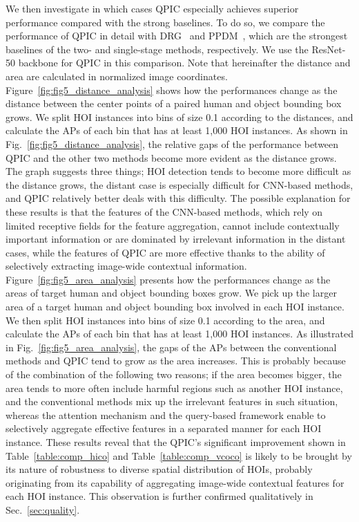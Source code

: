 \documentclass[final]{cvpr}
\begin{document}
We then investigate in which cases QPIC especially achieves superior performance compared with the strong baselines.
To do so, we compare the performance of QPIC in detail with DRG~\cite{gao_eccv2020} and PPDM~\cite{liao_cvpr2020}, which are the strongest baselines of the two- and single-stage methods, respectively. 
We use the ResNet-50 backbone for QPIC in this comparison.
Note that hereinafter the distance and area are calculated in normalized image coordinates.
Figure~\ref{fig:fig5_distance_analysis} shows how the performances change as the distance between the center points of a paired human and object bounding box grows.
We split HOI instances into bins of size 0.1 according to the distances, and calculate the APs of each bin that has at least 1,000 HOI instances.
As shown in Fig.~\ref{fig:fig5_distance_analysis}, the relative gaps of the performance between QPIC and the other two methods become more evident as the distance grows.
The graph suggests three things; 
 HOI detection tends to become more difficult as the distance grows,
 the distant case is especially difficult for CNN-based methods,
 and QPIC relatively better deals with this difficulty.
The possible explanation for these results is that the features of the CNN-based methods, which rely on limited receptive fields for the feature aggregation, 
cannot include contextually important information or are dominated by irrelevant information in the distant cases, while the features of QPIC are more effective thanks to the ability of selectively extracting image-wide contextual information.
Figure~\ref{fig:fig5_area_analysis} presents how the performances change as the areas of target human and object bounding boxes grow. 
We pick up the larger area of a target human and object bounding box involved in each HOI instance.
We then split HOI instances into bins of size 0.1 according to the area, and calculate the APs of each bin that has at least 1,000 HOI instances.
As illustrated in Fig.~\ref{fig:fig5_area_analysis}, 
the gaps of the APs between the conventional methods and QPIC tend to grow as the area increases.
This is probably because of the combination of the following two reasons;
 if the area becomes bigger, the area tends to more often include harmful regions such as another HOI instance,
 and the conventional methods mix up the irrelevant features in such situation, whereas the attention mechanism and the query-based framework enable to selectively aggregate effective features in a separated manner for each HOI instance. 
These results reveal that the QPIC's significant improvement shown in Table~\ref{table:comp_hico} and Table~\ref{table:comp_vcoco} is likely to be brought by its nature of robustness to diverse spatial distribution of HOIs, probably originating from its capability of aggregating image-wide contextual features for each HOI instance. This observation is further confirmed qualitatively in Sec.~\ref{sec:quality}.
\end{document}
